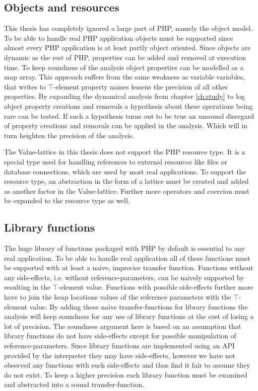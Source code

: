 \subsection{Objects and resources}	
This thesis has completely ignored a large part of PHP, namely the object model. To be able to handle real PHP application objects must be supported since almost every PHP application is at least partly object oriented. Since objects are dynamic as the rest of PHP, properties can be added and removed at execution time. To keep soundness of the analysis object properties can be modelled as a map array. This approach suffers from the same weakness as variable variables, that writes to $\top$-element property names lessens the precision of all other properties. By expanding the dynamical analysis from chapter \ref{ch:study} to log object property creations and removals a hypothesis about these operations being rare can be tested. If such a hypothesis turns out to be true an unsound disregard of property creations and removals can be applied in the analysis. Which will in turn heighten the precision of the analysis.

The Value-lattice in this thesis does not support the PHP resource type. It is a special type used for handling references to external resources like files or database connections, which are used by most real applications. To support the resource type, an abstraction in the form of a lattice must be created and added as another factor in the Value-lattice. Further more operators and coercion must be expanded to the resource type as well.

\subsection{Library functions}
The huge library of functions packaged with PHP by default is essential to any real application. To be able to handle real application all of these functions must be supported with at least a naive, imprecise transfer function. Functions without any side-effects, i.e. without reference-parameters, can be naively supported by resulting in the $\top$-element value. Functions with possible side-effects further more have to join the heap locations values of the reference parameters with the $\top$-element value. By adding these naive transfer-functions for library functions the analysis will keep soundness for any use of library functions at the cost of losing a lot of precision. The soundness argument here is based on an assumption that library functions do not have side-effects except for possible manipulation of reference-parameters. Since library functions are implemented using an API provided by the interpreter they may have side-effects, however we have not observed any functions with such side-effects and thus find it fair to assume they do not exist. To keep a higher precision each library function must be examined and abstracted into a sound transfer-function.

